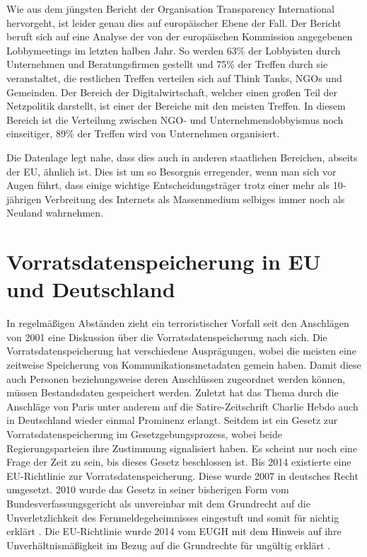 \documentclass[
	12pt,
	a4paper,
	BCOR10mm,
	DIV14,
	listof=totoc,
	bibliography=totoc,
	headsepline
]{scrreprt}
\begin{document}
Wie aus dem jüngsten Bericht der Organisation Transparency International \cite{lobby} hervorgeht, ist leider genau dies auf europäischer Ebene der Fall.
Der Bericht beruft sich auf eine Analyse der von der europäischen Kommission angegebenen Lobbymeetings im letzten halben Jahr.
So werden 63\% der Lobbyisten durch Unternehmen und Beratungsfirmen gestellt und 75\% der Treffen durch sie veranstaltet, die restlichen Treffen verteilen sich auf Think Tanks, NGOs und Gemeinden.
Der Bereich der Digitalwirtschaft, welcher einen großen Teil der Netzpolitik darstellt, ist einer der Bereiche mit den meisten Treffen.
In diesem Bereich ist die Verteilung zwischen NGO- und Unternehmenslobbyismus noch einseitiger, 89\% der Treffen wird von Unternehmen organisiert. 

Die Datenlage legt nahe, dass dies auch in anderen staatlichen Bereichen, abseits der EU, ähnlich ist. 
Dies ist um so Besorgnis erregender, wenn man sich vor Augen führt, dass einige wichtige Entscheidungsträger trotz einer mehr als 10-jährigen Verbreitung des Internets als Massenmedium selbiges immer noch als Neuland wahrnehmen. \cite{internetneuland}


\section{Vorratsdatenspeicherung in EU und Deutschland}
\label{survailance}
In regelmäßigen Abständen zieht ein terroristischer Vorfall seit den Anschlägen von 2001 eine Diskussion über die Vorratsdatenspeicherung nach sich.
Die Vorratsdatenspeicherung hat verschiedene Ausprägungen, wobei die meisten eine zeitweise Speicherung von Kommunikationsmetadaten gemein haben.
Damit diese auch Personen beziehungsweise deren Anschlüssen zugeordnet werden können, müssen Bestandsdaten gespeichert werden.
Zuletzt hat das Thema durch die Anschläge von Paris unter anderem auf die Satire-Zeitschrift Charlie Hebdo auch in Deutschland wieder einmal Prominenz erlangt.
Seitdem ist ein Gesetz zur Vorratsdatenspeicherung im Gesetzgebungsprozess, wobei beide Regierungsparteien ihre Zustimmung signalisiert haben.
Es scheint nur noch eine Frage der Zeit zu sein, bis dieses Gesetz beschlossen ist. 
Bis 2014 existierte eine EU-Richtlinie zur Vorratsdatenspeicherung.
Diese wurde 2007 in deutsches Recht umgesetzt.
2010 wurde das Gesetz in seiner bisherigen Form vom Bundesverfassungsgericht als unvereinbar mit dem Grundrecht auf die Unverletzlichkeit des Fernmeldegeheimnisses eingestuft und somit für nichtig erklärt \cite{bvg:no}.
Die EU-Richtlinie wurde 2014 vom EUGH mit dem Hinweis auf ihre Unverhältnismäßigkeit im Bezug auf die Grundrechte für ungültig erklärt \cite{eugh:no}.
\end{document}
